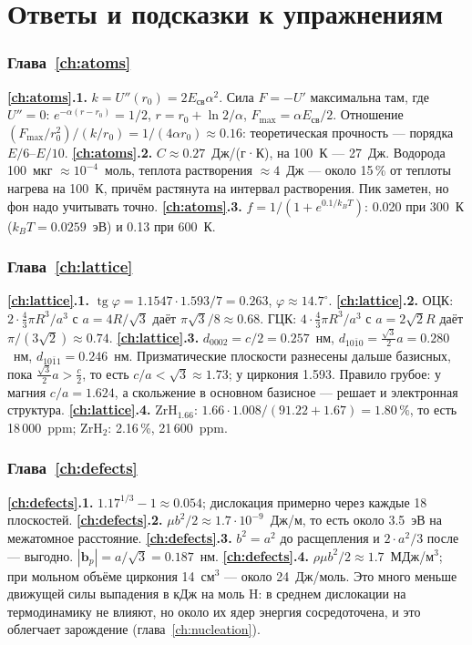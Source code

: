 \chapter{Ответы и подсказки к упражнениям}
\sloppy

\subsection*{Глава~\ref{ch:atoms}}
\textbf{\ref{ch:atoms}.1.} $k = U''(r_0) = 2E_{\text{св}}\alpha^2$. Сила $F = -U'$ максимальна там, где $U'' = 0$: $e^{-\alpha(r-r_0)} = 1/2$,
$r = r_0 + \ln2/\alpha$, $F_{\max} = \alpha E_{\text{св}}/2$. Отношение $(F_{\max}/r_0^2)/(k/r_0) = 1/(4\alpha r_0)\approx0.16$: теоретическая
прочность --- порядка $E/6$--$E/10$.
\textbf{\ref{ch:atoms}.2.} $C\approx0.27$~Дж/(г·К), на 100~К --- 27~Дж. Водорода 100~мкг $\approx10^{-4}$~моль, теплота растворения
$\approx4$~Дж --- около 15\,\% от теплоты нагрева на 100~К, причём растянута на интервал растворения. Пик заметен, но фон
надо учитывать точно.
\textbf{\ref{ch:atoms}.3.} $f = 1/(1+e^{0.1/k_BT})$: 0.020 при 300~К ($k_BT = 0.0259$~эВ) и 0.13 при 600~К.

\subsection*{Глава~\ref{ch:lattice}}
\textbf{\ref{ch:lattice}.1.} $\operatorname{tg}\varphi = 1.1547\cdot1.593/7 = 0.263$, $\varphi\approx14.7^\circ$.
\textbf{\ref{ch:lattice}.2.} ОЦК: $2\cdot\frac43\pi R^3/a^3$ с $a = 4R/\sqrt3$ даёт $\pi\sqrt3/8\approx0.68$. ГЦК: $4\cdot\frac43\pi R^3/a^3$ с
$a = 2\sqrt2R$ даёт $\pi/(3\sqrt2)\approx0.74$.
\textbf{\ref{ch:lattice}.3.} $d_{0002} = c/2 = 0.257$~нм, $d_{10\bar10} = \frac{\sqrt3}{2}a = 0.280$~нм, $d_{10\bar11} = 0.246$~нм.
Призматические плоскости разнесены дальше базисных, пока $\frac{\sqrt3}{2}a > \frac c2$, то есть $c/a < \sqrt3\approx1.73$;
у циркония 1.593. Правило грубое: у магния $c/a = 1.624$, а скольжение в основном базисное --- решает и электронная структура.
\textbf{\ref{ch:lattice}.4.} ZrH$_{1.66}$: $1.66\cdot1.008/(91.22 + 1.67) = 1.80\,\%$, то есть 18\,000~ppm; ZrH$_2$: 2.16\,\%, 21\,600~ppm.

\subsection*{Глава~\ref{ch:defects}}
\textbf{\ref{ch:defects}.1.} $1.17^{1/3}-1\approx0.054$; дислокация примерно через каждые 18 плоскостей.
\textbf{\ref{ch:defects}.2.} $\mu b^2/2\approx1.7\cdot10^{-9}$~Дж/м, то есть около 3.5~эВ на межатомное расстояние.
\textbf{\ref{ch:defects}.3.} $b^2 = a^2$ до расщепления и $2\cdot a^2/3$ после --- выгодно. $|\mathbf b_p| = a/\sqrt3 = 0.187$~нм.
\textbf{\ref{ch:defects}.4.} $\rho\mu b^2/2\approx1.7$~МДж/м$^3$; при мольном объёме циркония 14~см$^3$ --- около 24~Дж/моль. Это много меньше
движущей силы выпадения в кДж на моль H: в среднем дислокации на термодинамику не влияют, но около их ядер энергия
сосредоточена, и это облегчает зарождение (глава~\ref{ch:nucleation}).

